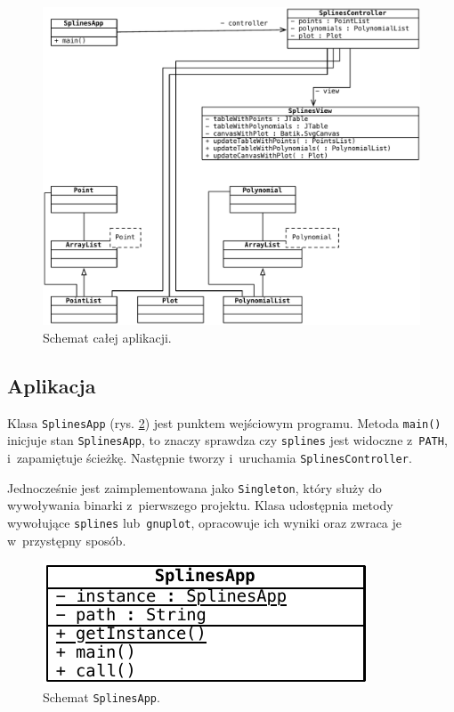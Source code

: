 \documentclass[10pt,a4paper]{article}
\newcommand{\f}[1]{\texttt{#1}}
\begin{document}
\newpage
\begin{figure}[ht]
  \begin{adjustwidth}{-3cm}{-3cm}
    \centering
    \includegraphics{figury/aplikacja}
    \caption{Schemat całej aplikacji.}
    \label{fig:aplikacja}
  \end{adjustwidth}
\end{figure}
\clearpage

\subsection{Aplikacja}

Klasa \f{SplinesApp} (rys. \ref{fig:aplikacja-szczegolowo}) jest punktem
wejściowym programu. Metoda \f{main()} inicjuje stan \f{SplinesApp}, to znaczy
sprawdza czy \f{splines} jest widoczne z~\f{PATH}, i~zapamiętuje ścieżkę.
Następnie tworzy i~uruchamia \f{SplinesController}.

Jednocześnie jest zaimplementowana jako \f{Singleton}, który służy do
wywoływania binarki z~pierwszego projektu. Klasa udostępnia metody wywołujące
\f{splines} lub~\f{gnuplot}, opracowuje ich wyniki oraz zwraca je w~przystępny
sposób.

\begin{figure}[hb]
  \centering
  \includegraphics{figury/aplikacja-szczegolowo}
  \caption{Schemat \f{SplinesApp}.}
  \label{fig:aplikacja-szczegolowo}
\end{figure}
\end{document}
